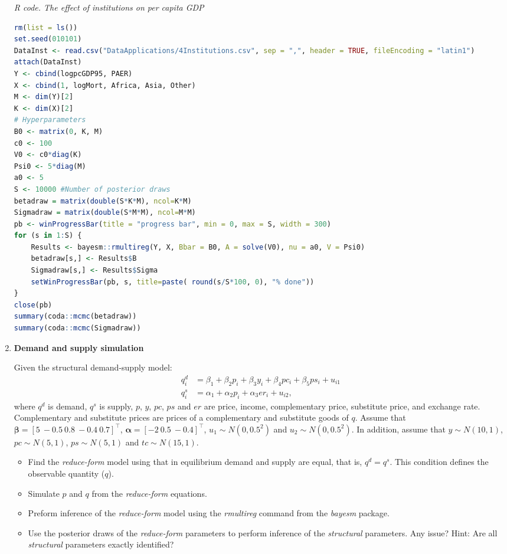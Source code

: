 \begin{enumerate}[leftmargin=*]
\begin{tcolorbox}[enhanced,width=4.67in,center upper,
	fontupper=\large\bfseries,drop shadow southwest,sharp corners]
	\textit{R code. The effect of institutions on per capita GDP}
	\begin{VF}
		\begin{lstlisting}[language=R]
rm(list = ls())
set.seed(010101)
DataInst <- read.csv("DataApplications/4Institutions.csv", sep = ",", header = TRUE, fileEncoding = "latin1")
attach(DataInst)
Y <- cbind(logpcGDP95, PAER)
X <- cbind(1, logMort, Africa, Asia, Other)
M <- dim(Y)[2]
K <- dim(X)[2]
# Hyperparameters
B0 <- matrix(0, K, M)
c0 <- 100
V0 <- c0*diag(K)
Psi0 <- 5*diag(M)
a0 <- 5
S <- 10000 #Number of posterior draws
betadraw = matrix(double(S*K*M), ncol=K*M)
Sigmadraw = matrix(double(S*M*M), ncol=M*M)
pb <- winProgressBar(title = "progress bar", min = 0, max = S, width = 300)
for (s in 1:S) {
	Results <- bayesm::rmultireg(Y, X, Bbar = B0, A = solve(V0), nu = a0, V = Psi0)
	betadraw[s,] <- Results$B
	Sigmadraw[s,] <- Results$Sigma
	setWinProgressBar(pb, s, title=paste( round(s/S*100, 0), "% done"))
}
close(pb)
summary(coda::mcmc(betadraw))
summary(coda::mcmc(Sigmadraw))
\end{lstlisting}
	\end{VF}
\end{tcolorbox} 
 
	\item \textbf{Demand and supply simulation}

Given the structural demand-supply model:
\begin{align*}
	q_i^d&=\beta_1+\beta_2p_i+\beta_3y_i+\beta_4pc_i+\beta_5ps_i+u_{i1}\\
	q_i^s&=\alpha_1+\alpha_2p_i+\alpha_3er_i+u_{i2},
\end{align*}
where $q^d$ is demand, $q^s$ is supply, $p$, $y$, $pc$, $ps$ and $er$ are price, income, complementary price, substitute price, and exchange rate. Complementary and substitute prices are prices of a complementary and substitute goods of $q$. Assume that $\bm{\beta}=\left[5 \ -0.5 \ 0.8 \ -0.4 \ 0.7\right]^{\top}$, $\bm{\alpha}=\left[-2 \ 0.5 \ -0.4\right]^{\top}$, $u_1\sim N(0, 0.5^2)$ and $u_2\sim N(0, 0.5^2)$. In addition, assume that $y\sim N(10,1)$, $pc\sim N(5,1)$, $ps\sim N(5,1)$ and $tc\sim N(15,1)$.
\begin{itemize}
	\item Find the \textit{reduce-form} model using that in equilibrium demand and supply are equal, that is, $q^d=q^s$. This condition defines the observable quantity ($q$).
	\item Simulate $p$ and $q$ from the \textit{reduce-form} equations.
	\item Preform inference of the \textit{reduce-form} model using the \textit{rmultireg} command from the \textit{bayesm} package.
	\item Use the posterior draws of the \textit{reduce-form} parameters to perform inference of the \textit{structural} parameters. Any issue? Hint: Are all \textit{structural} parameters exactly identified?   
\end{itemize}


\end{enumerate}
